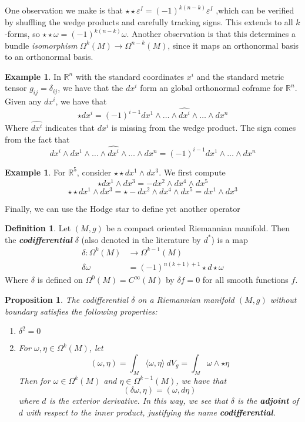 \documentclass[psamsfonts]{amsart}
\newtheorem{prop}[thm]{Proposition}
\theoremstyle{definition}
\newtheorem{defn}[thm]{Definition}
\newtheorem{exmp}[thm]{Example}
\theoremstyle{remark}
\newcommand{\R}{\mathbb{R}}
\newcommand{\ib}[1]{\textbf{\textit{#1}}}
\begin{document}
One observation we make is that $\star\star \varepsilon^I = (-1)^{k(n-k)}\varepsilon^I$ ,which can be verified by shuffling the wedge products and carefully tracking signs. This extends to all $k$-forms, so $\star \star\omega = (-1)^{k(n-k)}\omega$. Another observation is that this determines a bundle \emph{isomorphism} $\Omega^k(M) \to \Omega^{n-k}(M)$, since it maps an orthonormal basis to an orthonormal basis.
\begin{exmp}
In $\R^n$ with the standard coordinates $x^i$  and the standard metric tensor  $g_{ij} = \delta_{ij}$, we have that the $dx^i$ form an global orthonormal coframe for $\R^n$. Given any $dx^i$, we have that 
$$\star dx^i =  (-1)^{i-1} dx^1 \wedge \ldots \wedge \hat{dx^i} \wedge \ldots \wedge dx^n $$
Where $\hat{dx^i}$ indicates that $dx^i$ is missing  from the wedge product. The sign comes from the fact that 
$$dx^i \wedge dx^1 \wedge \ldots \wedge \hat{dx^i} \wedge \ldots \wedge dx^n = (-1)^{i-1} dx^1\wedge \ldots \wedge dx^n$$
\end{exmp}
%
\begin{exmp}
For $\R^5$,  consider $\star\star dx^1 \wedge dx^3$. We first compute
$$\star dx^1 \wedge dx^3 = -dx^2 \wedge dx^4 \wedge dx^5 $$
$$\star\star dx^1\wedge dx^3 = \star -dx^2 \wedge dx^4 \wedge dx^5 = dx^1 \wedge dx^3$$
\end{exmp}
%
Finally, we can use the Hodge star to define yet another operator
\begin{defn}
Let $(M,g)$ be a compact oriented Riemannian manifold. Then the \ib{codifferential} $\delta$ (also denoted in the literature by $d^*$) is a map
\begin{align*}
\delta: \Omega^k(M) &\to \Omega^{k-1}(M) \\
\delta \omega &= (-1)^{n(k+1)+1}\star d \star \omega
\end{align*}
Where $\delta$ is  defined on $\Omega^0(M) = C^\infty(M)$ by  $\delta f = 0$ for all smooth functions $f$.
\end{defn}
%
\begin{prop}
The codifferential $\delta$ on  a Riemannian manifold $(M,g)$ without boundary satisfies the following properties:
\begin{enumerate}
\item $\delta^2 = 0$ 
\item For $\omega,\eta \in \Omega^k(M)$, let 
$$(\omega, \eta) = \int_M \langle \omega, \eta \rangle ~dV_g = \int_M \omega \wedge \star \eta$$
Then for $\omega \in \Omega^k(M)$ and $\eta \in \Omega^{k-1}(M)$, we have that 
$$(\delta \omega, \eta) = (\omega, d\eta) $$
where $d$ is the exterior derivative. In this way, we see that $\delta$  is the \ib{adjoint} of $d$ with respect to the inner product, justifying the name \ib{codifferential}.
\end{enumerate}
\end{prop}
\end{document}
